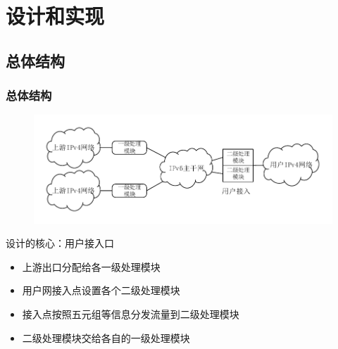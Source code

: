 \documentclass{beamer}
\begin{document}
\section{设计和实现}
\subsection{总体结构}
\begin{frame}
  \frametitle{总体结构}

  \begin{figure}
    \includegraphics[width=\textwidth]{figs/9-multi-egress.pdf}
  \end{figure}
  \vspace{-1em}

  \begin{block}{设计的核心：用户接入口}
    \begin{itemize}
    \item 上游出口分配给各一级处理模块
    \item 用户网接入点设置各个二级处理模块
    \item 接入点按照五元组等信息分发流量到二级处理模块
    \item 二级处理模块交给各自的一级处理模块
    \end{itemize}
  \end{block}
\end{frame}
\end{document}
